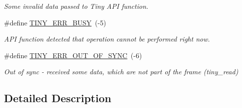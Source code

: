\begin{DoxyCompactItemize}
\begin{DoxyCompactList}\small\item\em Some invalid data passed to Tiny A\+P\+I function. \end{DoxyCompactList}\item 
\hypertarget{group__ERROR__FLAGS_ga9b3e170e1c6ce269f216ef4a1ac61995}{}\#define \hyperlink{group__ERROR__FLAGS_ga9b3e170e1c6ce269f216ef4a1ac61995}{T\+I\+N\+Y\+\_\+\+E\+R\+R\+\_\+\+B\+U\+S\+Y}~(-\/5)\label{group__ERROR__FLAGS_ga9b3e170e1c6ce269f216ef4a1ac61995}

\begin{DoxyCompactList}\small\item\em A\+P\+I function detected that operation cannot be performed right now. \end{DoxyCompactList}\item 
\hypertarget{group__ERROR__FLAGS_gae1949de45d9c478830dad9c9b996193a}{}\#define \hyperlink{group__ERROR__FLAGS_gae1949de45d9c478830dad9c9b996193a}{T\+I\+N\+Y\+\_\+\+E\+R\+R\+\_\+\+O\+U\+T\+\_\+\+O\+F\+\_\+\+S\+Y\+N\+C}~(-\/6)\label{group__ERROR__FLAGS_gae1949de45d9c478830dad9c9b996193a}

\begin{DoxyCompactList}\small\item\em Out of sync -\/ received some data, which are not part of the frame (tiny\+\_\+read) \end{DoxyCompactList}\end{DoxyCompactItemize}


\subsection{Detailed Description}
